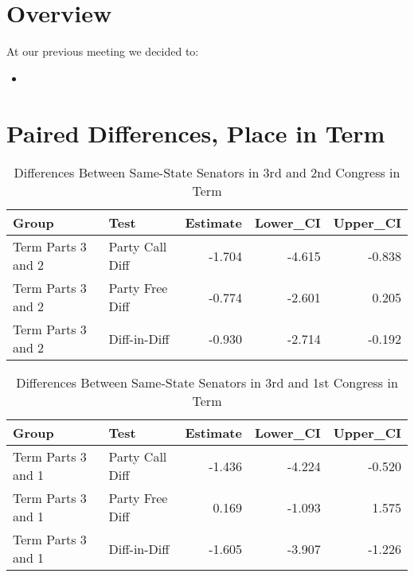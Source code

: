 \documentclass[12pt]{article}
\begin{document}
\section{Overview}

At our previous meeting we decided to:

\begin{itemize}
	
	\item 
	
\end{itemize}

\section{Paired Differences, Place in Term}

\begin{table}[H]
	\centering
	\caption{Differences Between Same-State Senators in 3rd and 2nd Congress in Term} 
	\begin{tabular}{llrrr}
		\hline
		Group & Test & Estimate & Lower\_CI & Upper\_CI \\ 
		\hline
		Term Parts 3 and 2 & Party Call Diff & -1.704 & -4.615 & -0.838 \\ 
		Term Parts 3 and 2 & Party Free Diff & -0.774 & -2.601 & 0.205 \\ 
		Term Parts 3 and 2 & Diff-in-Diff & -0.930 & -2.714 & -0.192 \\ 
		\hline
	\end{tabular}
\end{table}

\begin{table}[H]
	\centering
	\caption{Differences Between Same-State Senators in  3rd and 1st Congress in Term} 
	\begin{tabular}{llrrr}
		\hline
		Group & Test & Estimate & Lower\_CI & Upper\_CI \\ 
		\hline
		Term Parts 3 and 1 & Party Call Diff & -1.436 & -4.224 & -0.520 \\ 
		Term Parts 3 and 1 & Party Free Diff & 0.169 & -1.093 & 1.575 \\ 
		Term Parts 3 and 1 & Diff-in-Diff & -1.605 & -3.907 & -1.226 \\ 
		\hline
	\end{tabular}
\end{table}
\end{document}
